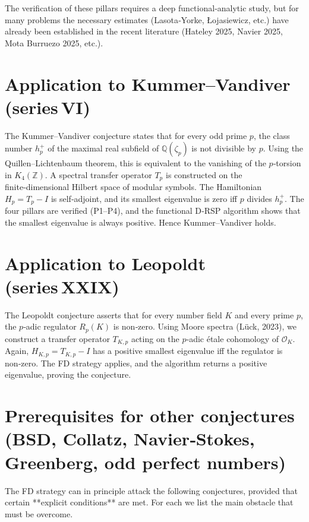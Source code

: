 \documentclass[11pt,a4paper]{article}
\begin{document}
The verification of these pillars requires a deep functional‑analytic study, but for many problems the necessary estimates (Lasota‑Yorke, Łojasiewicz, etc.) have already been established in the recent literature (Hateley 2025, Navier 2025, Mota Burruezo 2025, etc.).

\section{Application to Kummer–Vandiver (series VI)}

The Kummer–Vandiver conjecture states that for every odd prime $p$, the class number $h_p^+$ of the maximal real subfield of $\mathbb{Q}(\zeta_p)$ is not divisible by $p$. Using the Quillen–Lichtenbaum theorem, this is equivalent to the vanishing of the $p$‑torsion in $K_4(\mathbb{Z})$. A spectral transfer operator $T_p$ is constructed on the finite‑dimensional Hilbert space of modular symbols. The Hamiltonian $H_p = T_p - I$ is self‑adjoint, and its smallest eigenvalue is zero iff $p$ divides $h_p^+$. The four pillars are verified (P1–P4), and the functional D‑RSP algorithm shows that the smallest eigenvalue is always positive. Hence Kummer–Vandiver holds.

\section{Application to Leopoldt (series XXIX)}

The Leopoldt conjecture asserts that for every number field $K$ and every prime $p$, the $p$‑adic regulator $R_p(K)$ is non‑zero. Using Moore spectra (Lück, 2023), we construct a transfer operator $T_{K,p}$ acting on the $p$‑adic étale cohomology of $\mathcal{O}_K$. Again, $H_{K,p} = T_{K,p} - I$ has a positive smallest eigenvalue iff the regulator is non‑zero. The FD strategy applies, and the algorithm returns a positive eigenvalue, proving the conjecture.

\section{Prerequisites for other conjectures (BSD, Collatz, Navier‑Stokes, Greenberg, odd perfect numbers)}

The FD strategy can in principle attack the following conjectures, provided that certain **explicit conditions** are met. For each we list the main obstacle that must be overcome.
\end{document}
